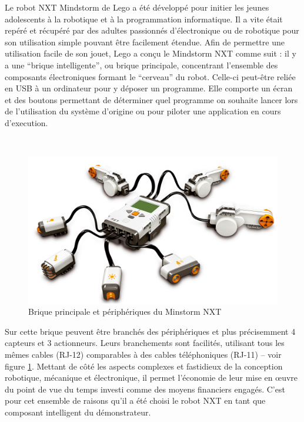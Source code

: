       Le robot NXT Mindstorm de Lego a été développé pour initier les jeunes
      adolescents à la robotique et à la programmation informatique. Il a vite
      était repéré et récupéré par des adultes passionnés d'électronique ou de
      robotique pour son utilisation simple pouvant être facilement
      étendue. Afin de permettre une utilisation facile de son jouet, Lego a
      conçu le Mindstorm NXT comme suit : il y a une ``brique intelligente'', ou
      brique principale, concentrant l'ensemble des composants électroniques
      formant le ``cerveau'' du robot. Celle-ci peut-être reliée en USB à un
      ordinateur pour y déposer un programme. Elle comporte un écran et des
      boutons permettant de déterminer quel programme on souhaite lancer lors de
      l'utilisation du système d'origine ou pour piloter une application en
      cours d'execution.

      ~
      
      \begin{figure}
        \centering
        \includegraphics[scale=0.6]{./img/impl-nxt.jpg}
        \caption{Brique principale et périphériques du Minstorm NXT}
        \label{fig:impl-nxt}
      \end{figure}

      Sur cette brique peuvent être branchés des périphériques et plus
      précisemment 4 capteurs et 3 actionneurs. Leurs branchements sont
      facilités, utilisant tous les mêmes cables (RJ-12) comparables à des
      cables téléphoniques (RJ-11) -- voir figure \ref{fig:impl-nxt}. Mettant de
      côté les aspects complexes et fastidieux de la conception robotique,
      mécanique et électronique, il permet l'économie de leur mise en \oe uvre
      du point de vue du temps investi comme des moyens financiers
      engagés. C'est pour cet ensemble de raisons qu'il a été choisi le robot
      NXT en tant que composant intelligent du démonstrateur.

